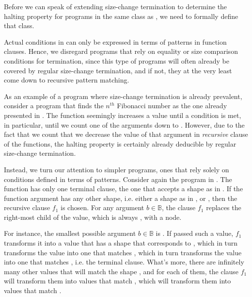 Before we can speak of extending size-change termination to determine the
halting property for programs in the same class as
, we need to formally define that class.

Actual conditions in \D{} can only be expressed in terms of patterns in
function clauses. Hence, we disregard programs that rely on equality or size
comparison conditions for termination, since this type of programs will often
already be covered by regular size-change termination, and if not, they at the
very least come down to recursive pattern matching.

As an example of a program where size-change termination is already prevalent,
consider a program that finds the $n^{th}$ Fibonacci number as the one already
presented in . The function 
seemingly increases a value until a condition is met, in particular, until we
count one of the arguments down to . However, due to the fact that we
count that we decrease the value of that argument in \emph{recursive} clause of
the  functions, the halting property is certainly already
deducible by regular size-change termination.

Instead, we turn our attention to simpler programs, ones that rely solely on
conditions defined in terms of patterns. Consider again the program in
. The function  has only one terminal
clause, the one that accepts a shape as in .
If the function argument has any other shape, i.e. either a shape as in
,  or
, then the recursive clause $f_1$ is
chosen. For any argument $b\in\mathbb{B}$, the clause $f_1$ replaces the
right-most child of the value, which is always , with a node.

For instance, the smallest possible argument $b\in\mathbb{B}$ is .  If
passed such a value, $f_1$ transforms it into a value that has a shape that
corresponds to , which in turn transforms
the value into one that matches , which in
turn transforms the value into one that matches
, i.e. the terminal clause. What's more,
there are infinitely many other values that will match the shape
, and for each of them, the clause $f_1$
will transform them into values that match
, which will transform them into values
that match .

